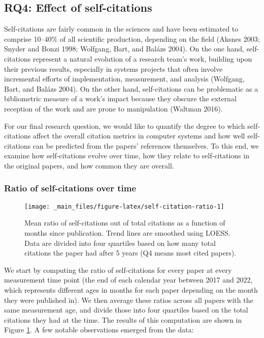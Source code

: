 \documentclass{article}
\begin{document}
\hypertarget{rq4-effect-of-self-citations}{%
\subsection{RQ4: Effect of self-citations}\label{rq4-effect-of-self-citations}}

Self-citations are fairly common in the sciences and have been estimated to comprise 10--40\% of all scientific production, depending on the field (Aksnes 2003; Snyder and Bonzi 1998; Wolfgang, Bart, and Balázs 2004).
On the one hand, self-citations represent a natural evolution of a research team's work, building upon their previous results, especially in systems projects that often involve incremental efforts of implementation, measurement, and analysis (Wolfgang, Bart, and Balázs 2004).
On the other hand, self-citations can be problematic as a bibliometric measure of a work's impact because they obscure the external reception of the work and are prone to manipulation (Waltman 2016).

For our final research question, we would like to quantify the degree to which self-citations affect the overall citation metrics in computer systems and how well self-citations can be predicted from the papers' references themselves.
To this end, we examine how self-citations evolve over time, how they relate to self-citations in the original papers, and how common they are overall.

\hypertarget{ratio-of-self-citations-over-time}{%
\subsubsection{Ratio of self-citations over time}\label{ratio-of-self-citations-over-time}}

\begin{figure}
\texttt{[image: \_main\_files/figure-latex/self-citation-ratio-1]} \caption{Mean ratio of self-citations out of total citations as a function of months since publication. Trend lines are smoothed using LOESS. Data are divided into four quartiles based on how many total citations the paper had after 5 years (Q4 means most cited papers).}\label{fig:self-citation-ratio}
\end{figure}

We start by computing the ratio of self-citations for every paper at every measurement time point (the end of each calendar year between 2017 and 2022, which represents different ages in months for each paper depending on the month they were published in).
We then average these ratios across all papers with the same measurement age, and divide those into four quartiles based on the total citations they had at the time.
The results of this computation are shown in Figure \ref{fig:self-citation-ratio}.
A few notable observations emerged from the data:
\end{document}

